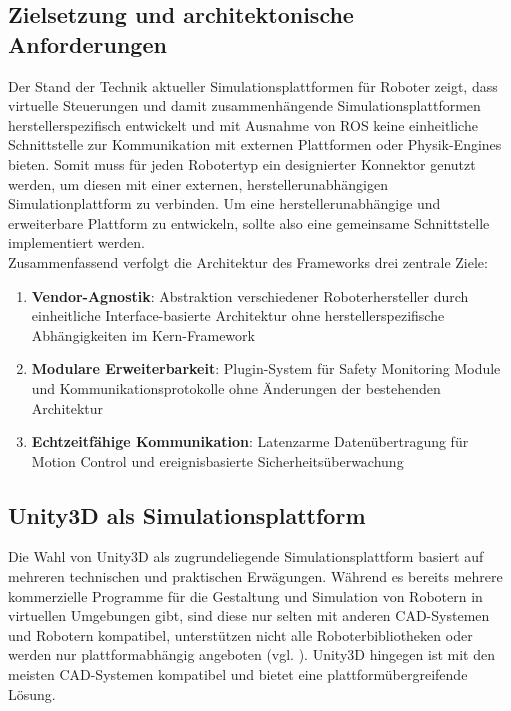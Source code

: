 \subsection{Zielsetzung und architektonische Anforderungen}
Der Stand der Technik aktueller Simulationsplattformen für Roboter zeigt, dass
virtuelle Steuerungen und damit zusammenhängende Simulationsplattformen
herstellerspezifisch entwickelt und mit Ausnahme von ROS keine einheitliche
Schnittstelle zur Kommunikation mit externen Plattformen oder Physik-Engines
bieten. Somit muss für jeden Robotertyp ein designierter Konnektor genutzt
werden, um diesen mit einer externen, herstellerunabhängigen Simulationplattform
zu verbinden. Um eine herstellerunabhängige und erweiterbare Plattform zu
entwickeln, sollte also eine gemeinsame Schnittstelle implementiert werden.\\

\noindent
Zusammenfassend verfolgt die Architektur des Frameworks drei zentrale Ziele:
\begin{enumerate}
	\item \textbf{Vendor-Agnostik}: Abstraktion verschiedener Roboterhersteller durch einheitliche Interface-basierte Architektur ohne herstellerspezifische Abhängigkeiten im Kern-Framework

	\item \textbf{Modulare Erweiterbarkeit}: Plugin-System für Safety Monitoring Module und Kommunikationsprotokolle ohne Änderungen der bestehenden Architektur

	\item \textbf{Echtzeitfähige Kommunikation}: Latenzarme Datenübertragung für Motion Control und ereignisbasierte Sicherheitsüberwachung
\end{enumerate}

\subsection{Unity3D als Simulationsplattform}

Die Wahl von Unity3D als zugrundeliegende Simulationsplattform basiert auf
mehreren technischen und praktischen Erwägungen. Während es bereits mehrere
kommerzielle Programme für die Gestaltung und Simulation von Robotern in
virtuellen Umgebungen gibt, sind diese nur selten mit anderen CAD-Systemen und
Robotern kompatibel, unterstützen nicht alle Roboterbibliotheken oder werden
nur plattformabhängig angeboten (vgl. ). Unity3D
hingegen ist mit den meisten CAD-Systemen kompatibel und bietet eine
plattformübergreifende Lösung.\\

